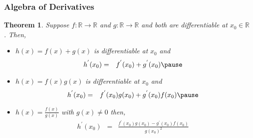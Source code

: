 \documentclass[aspectratio=169, handout]{beamer}
\newtheorem{thm}{Theorem}
\numberwithin{equation}{section}
\begin{document}
\begin{frame}
\frametitle{Algebra of Derivatives}

\begin{thm} Suppose $f:\mathbb{R} \rightarrow \mathbb{R}$ and $g:\mathbb{R} \rightarrow \mathbb{R}$ and both are differentiable at $x_{0} \in \mathbb{R}$.  Then, \pause 
\begin{itemize}
\item[i)] $h(x) = f(x) + g(x)$ is differentiable at $x_{0}$ and \pause 
\begin{eqnarray}
h^{'} (x_{0}) & = & f^{'}(x_{0}) + g^{'} (x_{0}) \nonumber \pause 
\end{eqnarray}
\item[ii)] $h(x) = f(x) g(x) $ is differentiable at $x_{0}$ and \pause 
\begin{eqnarray}
h^{'}(x_{0}) & = & f^{'}(x_{0}) g(x_{0}) + g^{'}(x_{0}) f(x_{0}) \nonumber  \pause 
\end{eqnarray}
\item[iii)] $h(x)  = \frac{f(x) }{g(x) }$ with $g(x) \neq 0$ then, \pause 
\begin{eqnarray}
h^{'}(x_{0}) & = &  \frac{f^{'}(x_{0}) g(x_{0}) - g^{'}(x_{0}) f(x_{0})} {g(x_{0})^2} \nonumber
\end{eqnarray}
\end{itemize}
\end{thm}

\end{frame}
\end{document}
